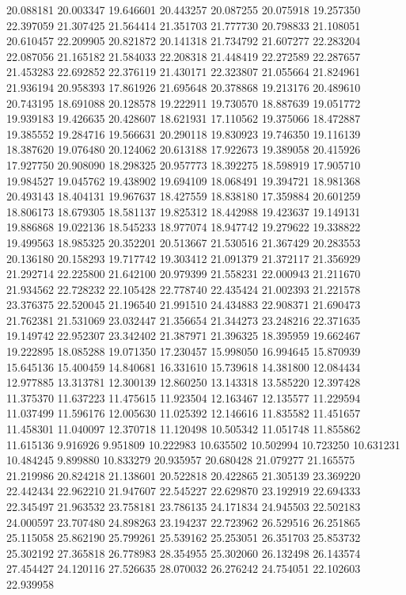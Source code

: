 20.088181
20.003347
19.646601
20.443257
20.087255
20.075918
19.257350
22.397059
21.307425
21.564414
21.351703
21.777730
20.798833
21.108051
20.610457
22.209905
20.821872
20.141318
21.734792
21.607277
22.283204
22.087056
21.165182
21.584033
22.208318
21.448419
22.272589
22.287657
21.453283
22.692852
22.376119
21.430171
22.323807
21.055664
21.824961
21.936194
20.958393
17.861926
21.695648
20.378868
19.213176
20.489610
20.743195
18.691088
20.128578
19.222911
19.730570
18.887639
19.051772
19.939183
19.426635
20.428607
18.621931
17.110562
19.375066
18.472887
19.385552
19.284716
19.566631
20.290118
19.830923
19.746350
19.116139
18.387620
19.076480
20.124062
20.613188
17.922673
19.389058
20.415926
17.927750
20.908090
18.298325
20.957773
18.392275
18.598919
17.905710
19.984527
19.045762
19.438902
19.694109
18.068491
19.394721
18.981368
20.493143
18.404131
19.967637
18.427559
18.838180
17.359884
20.601259
18.806173
18.679305
18.581137
19.825312
18.442988
19.423637
19.149131
19.886868
19.022136
18.545233
18.977074
18.947742
19.279622
19.338822
19.499563
18.985325
20.352201
20.513667
21.530516
21.367429
20.283553
20.136180
20.158293
19.717742
19.303412
21.091379
21.372117
21.356929
21.292714
22.225800
21.642100
20.979399
21.558231
22.000943
21.211670
21.934562
22.728232
22.105428
22.778740
22.435424
21.002393
21.221578
23.376375
22.520045
21.196540
21.991510
24.434883
22.908371
21.690473
21.762381
21.531069
23.032447
21.356654
21.344273
23.248216
22.371635
19.149742
22.952307
23.342402
21.387971
21.396325
18.395959
19.662467
19.222895
18.085288
19.071350
17.230457
15.998050
16.994645
15.870939
15.645136
15.400459
14.840681
16.331610
15.739618
14.381800
12.084434
12.977885
13.313781
12.300139
12.860250
13.143318
13.585220
12.397428
11.375370
11.637223
11.475615
11.923504
12.163467
12.135577
11.229594
11.037499
11.596176
12.005630
11.025392
12.146616
11.835582
11.451657
11.458301
11.040097
12.370718
11.120498
10.505342
11.051748
11.855862
11.615136
9.916926
9.951809
10.222983
10.635502
10.502994
10.723250
10.631231
10.484245
9.899880
10.833279
20.935957
20.680428
21.079277
21.165575
21.219986
20.824218
21.138601
20.522818
20.422865
21.305139
23.369220
22.442434
22.962210
21.947607
22.545227
22.629870
23.192919
22.694333
22.345497
21.963532
23.758181
23.786135
24.171834
24.945503
22.502183
24.000597
23.707480
24.898263
23.194237
22.723962
26.529516
26.251865
25.115058
25.862190
25.799261
25.539162
25.253051
26.351703
25.853732
25.302192
27.365818
26.778983
28.354955
25.302060
26.132498
26.143574
27.454427
24.120116
27.526635
28.070032
26.276242
24.754051
22.102603
22.939958
